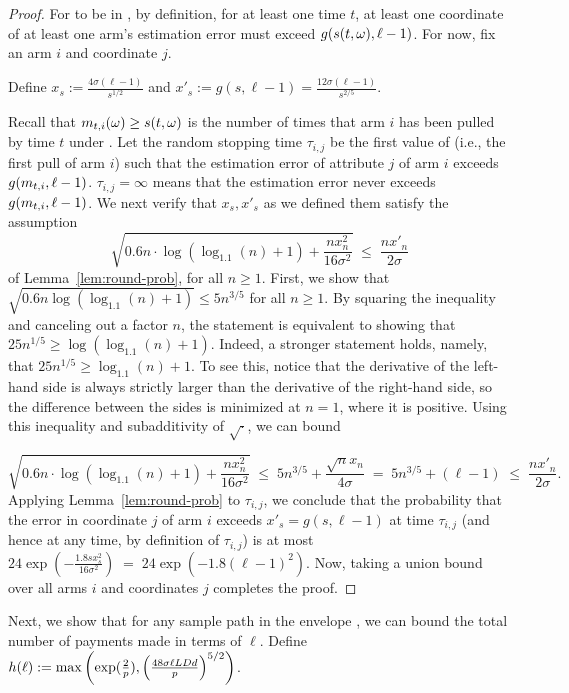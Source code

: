 \begin{proof}
For \SP to be in \Env{\ell}, by definition,
for at least one time $t$,
at least one coordinate of at least one arm's estimation error must
exceed $g(s(t,\omega),\ell-1)$.
For now, fix an arm $i$ and coordinate $j$.

Define $x_s := \frac{4 \sigma (\ell-1)}{s^{1/2}}$ and
$x'_s := g(s, \ell-1) = \frac{12 \sigma (\ell-1)}{s^{2/5}}$.

Recall that $m_{t,i}(\omega) \geq s(t,\omega)$ is the number of times
that arm $i$ has been pulled by time $t$ under \SP.
Let the random stopping time $\tau_{i,j}$ be the first value of
 (i.e., the first pull of arm $i$) such that 
the estimation error of attribute $j$ of arm $i$ exceeds
$g(m_{t,i}, \ell-1)$.
$\tau_{i,j} = \infty$ means that the estimation error never exceeds 
$g(m_{t,i}, \ell-1)$.
We next verify that $x_s, x'_s$ as we defined them satisfy the 
assumption 
\[
  \sqrt{0.6 n \cdot \log (\log_{1.1}(n) + 1) + \frac{n x_n^2}{16 \sigma^2}}
  \; \leq \; \frac{n x'_n}{2 \sigma}
\]
of Lemma~\ref{lem:round-prob}, for all $n \geq 1$.
First, we show that
$\sqrt{0.6n \log(\log_{1.1}(n)+1)} \leq 5 n^{3/5}$
for all $n \geq 1$.
By squaring the inequality and canceling out a factor $n$,
the statement is equivalent to showing that
$25 n^{1/5} \geq \log(\log_{1.1}(n)+1)$.
Indeed, a stronger statement holds, namely, that
$25 n^{1/5} \geq \log_{1.1}(n)+1$.  
To see this, notice that the derivative of the left-hand side is
always strictly larger than the derivative of the right-hand side,
so the difference between the sides is minimized at $n=1$,
where it is positive. 
Using this inequality and subadditivity of $\sqrt{\cdot}$, we can bound

\[
  \sqrt{0.6 n \cdot \log (\log_{1.1}(n) + 1) + \frac{n x_n^2}{16 \sigma^2}}
\; \leq \;
  5 n^{3/5} + \frac{\sqrt{n} x_n}{4 \sigma}
\; = \; 
  5 n^{3/5} + (\ell-1)
  \; \leq \; \frac{n x'_n}{2 \sigma}.
\]
Applying Lemma~\ref{lem:round-prob} to $\tau_{i,j}$,
we conclude that the probability that the error in coordinate $j$ of
arm $i$ exceeds $x'_s = g(s,\ell-1)$ at time $\tau_{i,j}$
(and hence at any time, by definition of $\tau_{i,j}$)
is at most
$24 \exp\left(-\frac{1.8 s x_s^2}{16 \sigma^2} \right)
\; = \; 24 \exp(-1.8 (\ell-1)^2)$.
Now, taking a union bound over all arms $i$ and
coordinates $j$ completes the proof.
\end{proof}

Next, we show that for any sample path \SP in the envelope \Env{\ell},
we can bound the total number of payments made in terms of $\ell$.
Define $h(\ell) := \max \left( \exp(\frac{2}{p}),
\left( \frac{48 \sigma \ell L D d}{p} \right)^{5/2}
\right)$.

